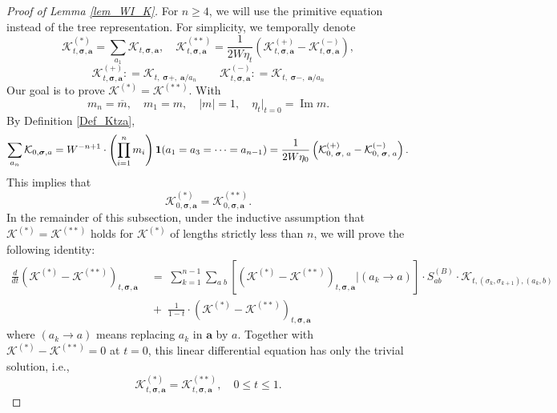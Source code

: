 \documentclass[10pt,a4paper]{amsart}
\DeclareMathOperator{\im}{{\mathrm{Im}}}
\newcommand{\cal}{\mathcal}
\renewcommand{\bar}{\overline}
\begin{document}
\begin{proof}[Proof of Lemma \ref{lem_WI_K}]
 For $n\ge 4$,   we will use the primitive equation instead of the tree representation. For simplicity, we temporally denote
 $$
{\cal K}^{(*)}_{t, \boldsymbol{\sigma}, \textbf{a}}
=\sum_{a_1}{\cal K} _{t, \boldsymbol{\sigma}, \textbf{a}},\quad
{\cal K}^{(**)}_{t, \boldsymbol{\sigma}, \textbf{a}}
=\frac1{2W\eta_t}\left({\cal K}^{(+)}_{t, \boldsymbol{\sigma}, \textbf{a}}-
{\cal K}^{(-)}_{t, \boldsymbol{\sigma}, \textbf{a}}\right),
$$
\begin{equation}\label{def_calKpm}
 {\cal K}^{(+)}_{t, \boldsymbol{\sigma}, \textbf{a}}: = {\cal K}_{t, \; \boldsymbol{\sigma}+,  \; \textbf{a}/a_n}
\quad\quad 
{\cal K}^{(-)}_{t, \boldsymbol{\sigma}, \textbf{a}}: = {\cal K}_{t, \; \boldsymbol{\sigma}-,  \; \textbf{a}/a_n}
   \end{equation}
Our goal is  to prove ${\cal K}^{(*)}={\cal K}^{(**)}$.  With
 $$
 m_n=\bar m, \quad m_1= m, \quad |m|=1, \quad \eta_t\big|_{t=0}=\im m. 
 $$
By Definition  \ref{Def_Ktza},    
 $$
  \sum_{a_n}{\cal K}_{0, \boldsymbol{\sigma}, \textbf{a}}=W^{-n+1}\cdot \left(\prod_{i=1}^n m_i \right){\bf 1}(a_1=a_3=\cdots =a_{n-1}) 
  =
  \frac{1}{2W\eta_0}\left(
  {\cal K}^{(+)}_{0,\; \boldsymbol{\sigma},\; \textbf{a}}
  - 
  {\cal K}^{(-)}_{0,\; \boldsymbol{\sigma},\; \textbf{a}}
  \right) .
 $$
This implies that 
 $${\cal K}^{(*)}_{0, \boldsymbol{\sigma}, \textbf{a}} ={\cal K}^{(**)}_{0, \boldsymbol{\sigma}, \textbf{a}}.$$
 In the remainder of this subsection,  under the inductive assumption that ${\cal K}^{(*)} ={\cal K} ^{(**)}$ holds for ${\cal K}^{(*)}$ of lengths strictly less than $n$,  we will  prove  the following identity: 
  \begin{align}\label{finK*-K}
     \frac d{dt}\left({\cal K}^{(*)}-{\cal K}^{(**)}\right)_{t, \boldsymbol{\sigma}, \textbf{a}} &\;=\;\sum_{ k=1}^{n-1} \sum_{a\;b}
        \left[\left({\cal K}^{(*)}-{\cal K}^{(**)}\right)_{t, \boldsymbol{\sigma}, \textbf{a}}\Bigg|(a_k\to a)\right]
        \cdot S^{(B)}_{ab}\cdot  {\cal K}_{t, ( \sigma _k,  \sigma _{k+1}), (a_k,b)}
        \\\nonumber
       &\;+\; \frac1{1-t}\cdot \left({\cal K}^{(*)}-{\cal K}^{(**)}\right)_{t, \boldsymbol{\sigma}, \textbf{a}} 
 \end{align}
 where $(a_k\to a)$ means replacing $a_k$ in $\textbf{a}$ by $a$.  Together with ${\cal K}^{(*)}-{\cal K}^{(**)}=0$ at $t=0$, this linear differential equation  has only the trivial solution, i.e., 
$$
{\cal K}^{(*)}_{t, \boldsymbol{\sigma}, \textbf{a}} ={\cal K}^{(**)}_{t, \boldsymbol{\sigma}, \textbf{a}}, \quad 0\le t\le 1.
$$
 

\end{proof}
\end{document}
